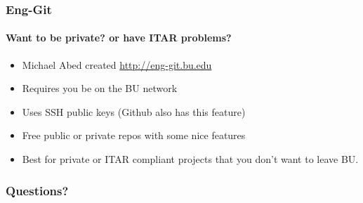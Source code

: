 \documentclass{beamer}
\begin{document}
  \begin{frame}
    \frametitle{Eng-Git}
    \framesubtitle{Want to be private? or have ITAR problems?}

    \begin{itemize}
  		\item Michael Abed created \url{http://eng-git.bu.edu}
  		\item Requires you be on the BU network
  		\item Uses SSH public keys (Github also has this feature)
  		\item Free public or private repos with some nice features
  		\item Best for private or ITAR compliant projects that you don't want 
  			  to leave BU.
    \end{itemize}
  \end{frame}

  \begin{frame}
    \frametitle{Questions?}
  \end{frame}
\end{document}
